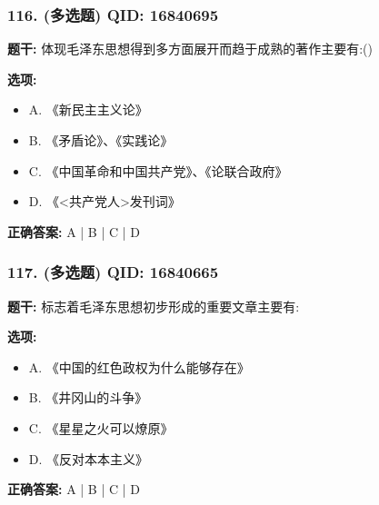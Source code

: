 \documentclass[12pt,UTF8]{ctexart}
\begin{document}
\vspace{0.3em}\hrulefill\vspace{0.7em}

\subsubsection*{116. (多选题) \small QID: 16840695}

\textbf{题干:}
体现毛泽东思想得到多方面展开而趋于成熟的著作主要有:()

\textbf{选项:}
\begin{itemize}[leftmargin=*]

  \item A. 《新民主主义论》

  \item B. 《矛盾论》、《实践论》

  \item C. 《中国革命和中国共产党》、《论联合政府》

  \item D. 《<共产党人>发刊词》

\end{itemize}

\textbf{正确答案:}
A | B | C | D

\vspace{0.3em}\hrulefill\vspace{0.7em}

\subsubsection*{117. (多选题) \small QID: 16840665}

\textbf{题干:}
标志着毛泽东思想初步形成的重要文章主要有:

\textbf{选项:}
\begin{itemize}[leftmargin=*]

  \item A. 《中国的红色政权为什么能够存在》

  \item B. 《井冈山的斗争》

  \item C. 《星星之火可以燎原》

  \item D. 《反对本本主义》

\end{itemize}

\textbf{正确答案:}
A | B | C | D

\vspace{0.3em}\hrulefill\vspace{0.7em}
\end{document}
